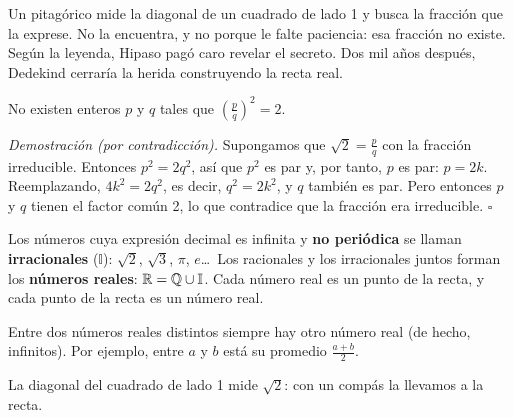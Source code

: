 \documentclass[11pt]{article}
\begin{document}
\label{tema:irracionales}

\begin{hilo}
Un pitagórico mide la diagonal de un cuadrado de lado 1 y busca la fracción que la
exprese. No la encuentra, y no porque le falte paciencia: esa fracción no existe.
Según la leyenda, Hipaso pagó caro revelar el secreto. Dos mil años después,
Dedekind cerraría la herida construyendo la recta real.
\end{hilo}

\begin{teorema}
No existen enteros $p$ y $q$ tales que $\left(\frac{p}{q}\right)^2 = 2$.
\end{teorema}

\emph{Demostración (por contradicción).} Supongamos que $\sqrt{2} = \frac{p}{q}$ con
la fracción irreducible. Entonces $p^2 = 2q^2$, así que $p^2$ es par y, por tanto,
$p$ es par: $p = 2k$. Reemplazando, $4k^2 = 2q^2$, es decir, $q^2 = 2k^2$, y $q$
también es par. Pero entonces $p$ y $q$ tienen el factor común 2, lo que
contradice que la fracción era irreducible. \hfill$\square$

Los números cuya expresión decimal es infinita y \textbf{no periódica} se llaman
\textbf{irracionales} ($\mathbb{I}$): $\sqrt{2}$, $\sqrt{3}$, $\pi$, $e$\ldots\ Los
racionales y los irracionales juntos forman los \textbf{números reales}:
$\mathbb{R} = \mathbb{Q} \cup \mathbb{I}$. Cada número real es un punto de la recta, y cada punto
de la recta es un número real.

\begin{definicion}[Densidad]
Entre dos números reales distintos siempre hay otro número real (de hecho,
infinitos). Por ejemplo, entre $a$ y $b$ está su promedio $\frac{a+b}{2}$.
\end{definicion}

\begin{center}

{\small La diagonal del cuadrado de lado 1 mide $\sqrt{2}$: con un compás la
llevamos a la recta.}
\end{center}
\end{document}
